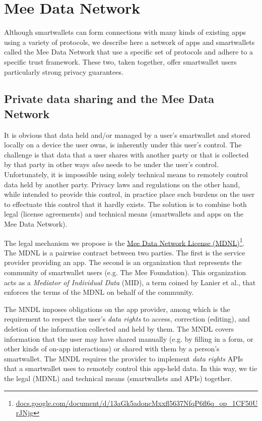 \documentclass[11pt, oneside]{article}   	%
\newcommand{\hyperfootnote}[1][]{\def\ArgI{{#1}}\hyperfootnoteRelay}
\newcommand\hyperfootnoteRelay[2][]{\href{#1#2}{\ArgI}\footnote{\href{#1#2}{#2}}}
\begin{document}
\section{Mee Data Network}\label{sec:MDN2} %

Although smartwallets can form connections with many kinds of existing apps using a variety of protocols, we describe here a network of apps and smartwallets called the Mee Data Network that use a specific set of protocols and adhere to a specific trust framework. These two, taken together, offer smartwallet users particularly strong privacy guarantees.

\subsection{Private data sharing and the Mee Data Network}

It is obvious that data held and/or managed by a user's smartwallet and stored locally on a device the user owns, is inherently under this user's control. The challenge is that data that a user shares with another party or that is collected by that party in other ways \emph{also} needs to be under the user's control. Unfortunately, it is impossible using solely technical means to remotely control data held by another party. Privacy laws and regulations on the other hand, while intended to provide this control, in practice place such burdens on the user to effectuate this control that it hardly exists. The solution is to combine both legal (license agreements) and technical means (smartwallets and apps on the Mee Data Network). 

The legal mechanism we propose is the \hyperfootnote[Mee Data Network License (MDNL)][https://]{docs.google.com/document/d/13aGk5adoncMxxfl5637NfqP6fl6q\_op\_1CF50UrJNjg}. The MDNL is a pairwise contract between two parties. The first is the service provider providing an app. The second is an organization that represents the community of smartwallet users (e.g. The Mee Foundation). This organization acts as a \emph{Mediator of Individual Data} (MID), a term coined by Lanier et al.\cite{Lanier2018}, that enforces the terms of the MDNL on behalf of the community. 

The MNDL imposes obligations on the app provider, among which is the requirement to respect the user's \emph{data rights} to access, correction (editing), and deletion of the information collected and held by them. The MNDL covers information that the user may have shared manually (e.g. by filling in a form, or other kinds of on-app interactions) or shared with them by a person's smartwallet. The MNDL requires the provider to implement \emph{data rights} APIs that a smartwallet uses to remotely control this app-held data. In this way, we tie the legal (MDNL) and technical means (smartwallets and APIs) together.
\end{document}
